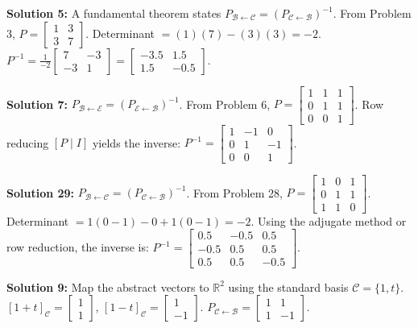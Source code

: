 \documentclass[11pt]{article}
\begin{document}
\vspace{0.5cm}
\textbf{Solution 5:} A fundamental theorem states $P_{\mathcal{B} \leftarrow \mathcal{C}} = (P_{\mathcal{C} \leftarrow \mathcal{B}})^{-1}$.
From Problem 3, $P = \begin{bmatrix} 1 & 3 \\ 3 & 7 \end{bmatrix}$.
Determinant $= (1)(7) - (3)(3) = -2$.
$P^{-1} = \frac{1}{-2} \begin{bmatrix} 7 & -3 \\ -3 & 1 \end{bmatrix} = \begin{bmatrix} -3.5 & 1.5 \\ 1.5 & -0.5 \end{bmatrix}$.

\vspace{0.5cm}
\textbf{Solution 7:} $P_{\mathcal{B} \leftarrow \mathcal{E}} = (P_{\mathcal{E} \leftarrow \mathcal{B}})^{-1}$.
From Problem 6, $P = \begin{bmatrix} 1 & 1 & 1 \\ 0 & 1 & 1 \\ 0 & 0 & 1 \end{bmatrix}$.
Row reducing $[P \mid I]$ yields the inverse:
$P^{-1} = \begin{bmatrix} 1 & -1 & 0 \\ 0 & 1 & -1 \\ 0 & 0 & 1 \end{bmatrix}$.

\vspace{0.5cm}
\textbf{Solution 29:} $P_{\mathcal{B} \leftarrow \mathcal{C}} = (P_{\mathcal{C} \leftarrow \mathcal{B}})^{-1}$.
From Problem 28, $P = \begin{bmatrix} 1 & 0 & 1 \\ 0 & 1 & 1 \\ 1 & 1 & 0 \end{bmatrix}$.
Determinant $= 1(0 - 1) - 0 + 1(0 - 1) = -2$.
Using the adjugate method or row reduction, the inverse is:
$P^{-1} = \begin{bmatrix} 0.5 & -0.5 & 0.5 \\ -0.5 & 0.5 & 0.5 \\ 0.5 & 0.5 & -0.5 \end{bmatrix}$.

\vspace{0.5cm}
\textbf{Solution 9:} Map the abstract vectors to $\mathbb{R}^2$ using the standard basis $\mathcal{C} = \{1, t\}$.
$[1+t]_{\mathcal{C}} = \begin{bmatrix} 1 \\ 1 \end{bmatrix}$, $[1-t]_{\mathcal{C}} = \begin{bmatrix} 1 \\ -1 \end{bmatrix}$.
$P_{\mathcal{C} \leftarrow \mathcal{B}} = \begin{bmatrix} 1 & 1 \\ 1 & -1 \end{bmatrix}$.
\end{document}
